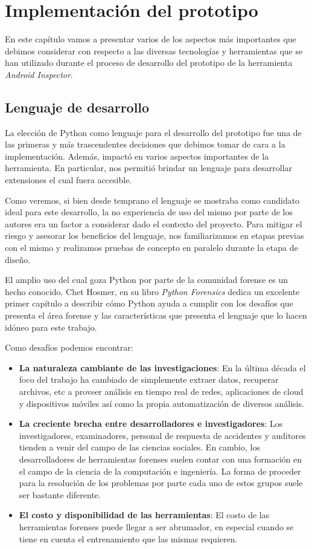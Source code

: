 \chapter{Implementación del prototipo} \label{chap:Implementacion}
En este capítulo vamos a presentar varios de los aspectos más importantes que debimos considerar con respecto a las diversas tecnologías y herramientas que se han utilizado durante el proceso de desarrollo del prototipo de la herramienta \emph{Android Inspector}.

\section{Lenguaje de desarrollo}
\label{lenguajeDeDesarrollo}
La elección de Python como lenguaje para el desarrollo del prototipo fue una de las primeras y más trascendentes decisiones que debimos tomar de cara a la implementación. Además, impactó en varios aspectos importantes de la herramienta. En particular, nos permitió brindar un lenguaje para desarrollar extensiones el cual fuera accesible.

Como veremos, si bien desde temprano el lenguaje se mostraba como candidato ideal para este desarrollo, la no experiencia de uso del mismo por parte de los autores era un factor a considerar dado el contexto del proyecto. Para mitigar el riesgo y asesorar los beneficios del lenguaje, nos familiarizamos en etapas previas con el mismo y realizamos pruebas de concepto en paralelo durante la etapa de diseño.

El amplio uso del cual goza Python por parte de la comunidad forense es un hecho conocido. Chet Hosmer, en su libro \emph{Python Forensics} \cite{Hosmer20141} dedica un excelente primer capítulo a describir cómo Python ayuda a cumplir con los desafíos que presenta el área forense y las características que presenta el lenguaje que lo hacen idóneo para este trabajo.

Como desafíos podemos encontrar:

\begin{itemize}
\item \textbf{La naturaleza cambiante de las investigaciones}: En la última década el foco del trabajo ha cambiado de simplemente extraer datos, recuperar archivos, etc a proveer análisis en tiempo real de redes, aplicaciones de cloud y dispositivos móviles así como la propia automatización de diversos análisis.
\item \textbf{La creciente brecha entre desarrolladores e investigadores}: Los investigadores, examinadores, personal de respuesta de accidentes y auditores tienden a venir del campo de las ciencias sociales. En cambio, los desarrolladores de herramientas forenses suelen contar con una formación en el campo de la ciencia de la computación e ingeniería. La forma de proceder para la resolución de los problemas por parte cada uno de estos grupos suele ser bastante diferente.
\item \textbf{El costo y disponibilidad de las herramientas}: El costo de las herramientas forenses puede llegar a ser abrumador, en especial cuando se tiene en cuenta el entrenamiento que las mismas requieren.
\end{itemize}

